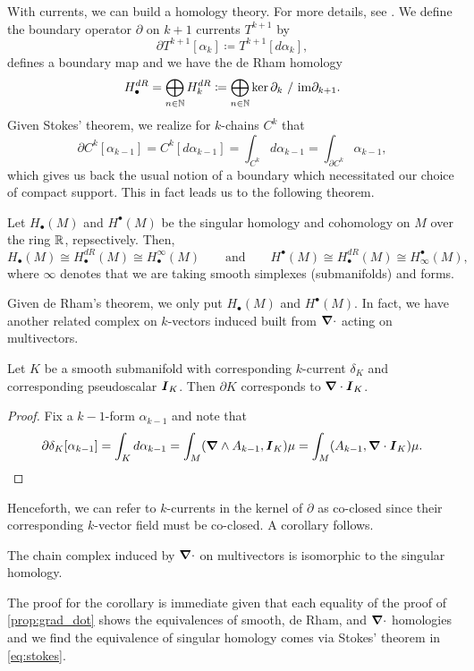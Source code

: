 \documentclass[conf]{new-aiaa}
\begin{document}
With currents, we can build a homology theory. For more details, see \cite{iversen_cauchy_1989}. We define the boundary operator $\partial$ on $k+1$ currents $T^{k+1}$ by
\begin{equation}
\partial T^{k+1}[\alpha_k] \coloneqq T^{k+1}[d\alpha_k],
\end{equation}
defines a boundary map and we have the de Rham homology
\begin{equation}
H_\bullet^{dR} = \bigoplus_{n\in \mathbb{N}} H_k^{dR} \coloneqq \bigoplus_{n\in \mathbb{N}} \ker \partial_k ~/~ \mathrm{im} \partial_{k+1}. 
\end{equation}
Given Stokes' theorem, we realize for $k$-chains $C^k$ that
\begin{equation}
\label{eq:stokes}
\partial C^k[\alpha_{k-1}] = C^k[d\alpha_{k-1}] = \int_{C^k} d\alpha_{k-1} = \int_{\partial C^k} \alpha_{k-1},
\end{equation}
which gives us back the usual notion of a boundary which necessitated our choice of compact support. This in fact leads us to the following theorem.
\begin{theorem}
    Let $H_\bullet(M)$ and $H^\bullet(M)$ be the singular homology and cohomology on $M$ over the ring $\mathbb{R}$, repsectively. Then,
\begin{equation}
    H_\bullet(M)\cong H_\bullet^{dR}(M) \cong H_\bullet^\infty(M) \qquad \textrm{and} \qquad H^\bullet(M) \cong H_\bullet^{dR}(M) \cong H^\bullet_\infty(M),
\end{equation}
where $\infty$ denotes that we are taking smooth simplexes (submanifolds) and forms.
\end{theorem}
Given de Rham's theorem, we only put $H_\bullet(M)$ and $H^\bullet(M)$. In fact, we have another related complex on $k$-vectors induced built from $\boldsymbol{\nabla} \cdot$ acting on multivectors. 
\begin{proposition}
\label{prop:grad_dot}
    Let $K$ be a smooth submanifold with corresponding $k$-current $\delta_K$ and corresponding pseudoscalar $\boldsymbol{I}_K$. Then $\partial K$ corresponds to $\boldsymbol{\nabla} \cdot \boldsymbol{I}_K$.
\end{proposition}
\begin{proof}
Fix a $k-1$-form $\alpha_{k-1}$ and note that
\begin{align}
    \partial \delta_K [\alpha_{k-1}] = \int_K d\alpha_{k-1}= \int_M(\boldsymbol{\nabla} \wedge A_{k-1},\boldsymbol{I}_K)\mu = \int_M(A_{k-1},\boldsymbol{\nabla} \cdot \boldsymbol{I}_K) \mu.
\end{align}
\end{proof}
Henceforth, we can refer to $k$-currents in the kernel of $\partial$ as co-closed since their corresponding $k$-vector field must be co-closed. A corollary follows.
\begin{corollary}
    The chain complex induced by $\boldsymbol{\nabla} \cdot$ on multivectors is isomorphic to the singular homology. 
\end{corollary}
The proof for the corollary is immediate given that each equality of the proof of \cref{prop:grad_dot} shows the equivalences of smooth, de Rham, and $\boldsymbol{\nabla} \cdot$ homologies and we find the equivalence of singular homology comes via Stokes' theorem in \cref{eq:stokes}.
\end{document}
